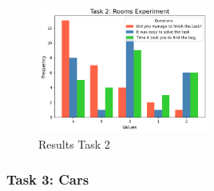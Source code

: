 \begin{figure}[H]
    \centering
    \includegraphics[width=0.5\textwidth]{figures/task2.png}
    \caption{Results Task 2}
    \label{fig:task2}
\end{figure}

\subsubsection{Task 3: Cars}

